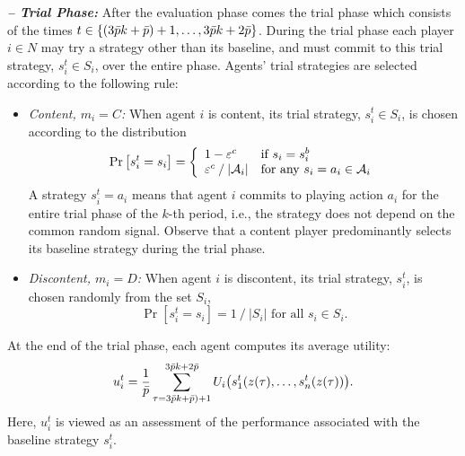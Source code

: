 \vspace{.1cm}
%
\noindent \emph{\textbf{-- Trial Phase:}} After the evaluation phase comes the trial phase which consists of the times $t \in \{(3\bar{p} k + \bar{p})+1,\ldots ,3\bar{p} k +2 \bar{p}\}$.  During the trial phase each player $i\in N$ may try a strategy other than its baseline, and must commit to this trial strategy, $s_i^t \in S_i$, over the entire phase.  Agents' trial strategies are selected according to the following rule:
%


\begin{itemize}%
%
\item \emph{Content, $m_i = C$:}
When agent $i$ is content, its trial strategy, $s_i^t \in S_i$, is chosen according to the  distribution
\begin{equation}
\operatorname{ Pr }\left[s_i^t = s_i \right] = \left\{
\begin{array}{ll}
1 - \varepsilon^c &\text{if }s_i = s_i^b \\
\varepsilon^c \mathbin{/} |\mathcal{A}_i|&\text{for any } s_i = a_i\in\mathcal{A}_i
\end{array}\right.
\end{equation}
%
A strategy $s_i^t = a_i$ means that agent $i$ commits to playing action $a_i$ for the entire trial phase of the $k$-th period, i.e., the strategy does not depend on the common random signal.  Observe that a content player predominantly selects its baseline strategy during the trial phase.

\item \emph{Discontent, $m_i = D$:}
When agent $i$ is discontent, its trial strategy, $s_i^t$, is chosen randomly from the set $S_i$,
\begin{equation}\label{eq:981}
\Pr\left[s_i^t = s_i\right] = 1\mathbin{/} |S_i| \text{ for all } s_i\in S_i.
\end{equation}
%

%
\end{itemize}

At the end of the trial phase, each agent computes its average utility:
%
\begin{equation}\label{e:trial payoff}
u_i^t = {1\over \bar{p}}\sum_{\tau = 3\bar{p} k + \bar{p})+1}^{3\bar{p} k +2 \bar{p}}U_i\bigl(s_1^t(z(\tau), \dots, s_n^t(z(\tau))  \bigr).
\end{equation}
%
Here, $u_i^t$ is viewed as an assessment of the performance associated with the baseline strategy $s_i^t$.  
%

